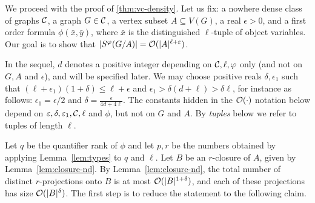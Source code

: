We proceed with the proof of \autoref{thm:vc-density}.
%
 Let us fix: a nowhere dense class of graphs $\CCC$, a graph $G\in \CCC$, a vertex subset $A\subseteq V(G)$, a real $\epsilon>0$, and 
 a first order formula $\phi(\bar x,\bar y)$, where $\bar x$ is the distinguished $\ell$-tuple of object variables.
 Our goal is to show that $|S^\phi(G/A)|=\Oof(|A|^{\ell+\epsilon})$.
 	   
In the sequel, $d$ denotes a positive integer 
depending on ${\cal C},\ell,\phi$ only (and not on $G, A$ and $\epsilon$), and will be specified later. We may choose positive reals
$\delta,\epsilon_1$ such that 
	 $(\ell+\epsilon_1)(1+\delta) 
	 \le
	 \ell+\epsilon$ and $\epsilon_1>\delta(d+\ell)> \delta\ell$, for instance as follows: $\epsilon_1=\epsilon/2$ and $\delta=\frac{\epsilon}{4d+4\ell}$.
The constants hidden in the $\Oof(\cdot)$ notation below depend
 on $\epsilon,\delta,\epsilon_1,\cal C, \ell$ and $\phi$, but not on $G$ and $A$.   By \emph{tuples} below we refer to tuples of length $\ell$.

	Let $q$ be the quantifier rank of $\phi$ and let 
$p,r$ be the numbers obtained by applying Lemma~\ref{lem:types} to $q$ and $\ell$.
Let $B$ be an $r$-closure of $A$, given by Lemma~\ref{lem:closure-nd}.
  By Lemma~\ref{lem:closure-nd}, the total number of distinct $r$-projections onto $B$ 
  is at most $\Oof(|B|^{1+\delta})$, and each of these projections has size $\Oof(|B|^{\delta})$.
	\setcounter{claim}{0}
%	
The first step is to reduce the statement to the following claim.


